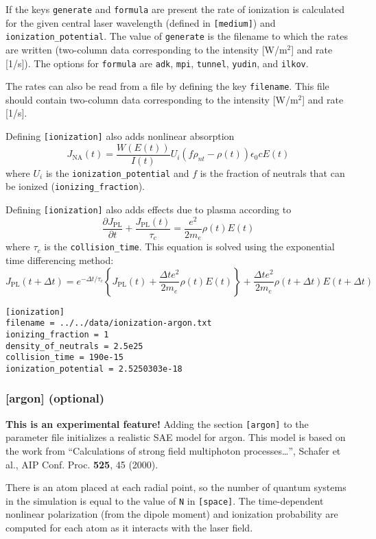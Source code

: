 \documentclass{article}
\begin{document}
If the keys \texttt{generate} and \texttt{formula} are present the
rate of ionization is calculated for the given central laser
wavelength (defined in \texttt{[medium]}) and
\texttt{ionization\_potential}. The value of \texttt{generate} is the
filename to which the rates are written (two-column data corresponding
to the intensity [W/m$^2$] and rate [1/s]). The options for
\texttt{formula} are \texttt{adk}, \texttt{mpi}, \texttt{tunnel},
\texttt{yudin}, and \texttt{ilkov}.

The rates can also be read from a file by defining the key
\texttt{filename}. This file should contain two-column data
corresponding to the intensity [W/m$^2$] and rate [1/s].

Defining \texttt{[ionization]} also adds nonlinear absorption
\[J_{\mathrm{NA}}(t) = \frac{W(E(t))}{I(t)} U_i \left(f\rho_{nt} -
    \rho(t)\right) \epsilon_0 c E(t)\] where $U_i$ is the
\texttt{ionization\_potential} and $f$ is the fraction of neutrals
that can be ionized (\texttt{ionizing\_fraction}).

Defining \texttt{[ionization]} also adds effects due to plasma according to
\[\frac{\partial J_{\mathrm{PL}}}{\partial t} + \frac{J_{\mathrm{PL}}(t)}{\tau_c} = \frac{e^2}{2 m_e} \rho(t) E(t)\]
where $\tau_c$ is the \texttt{collision\_time}. This equation is
solved using the exponential time differencing method:
\[J_{\mathrm{PL}}(t+\Delta t) = e^{-\Delta t/\tau_c}\left\{J_{\mathrm{PL}}(t) + \frac{\Delta t e^2}{2 m_e}\rho(t)E(t)\right\} + \frac{\Delta t e^2}{2 m_e} \rho(t+\Delta t) E(t+\Delta t)\]

\begin{lstlisting}
[ionization]
filename = ../../data/ionization-argon.txt
ionizing_fraction = 1
density_of_neutrals = 2.5e25
collision_time = 190e-15
ionization_potential = 2.5250303e-18
\end{lstlisting}

\subsubsection{[argon] (optional)}
\textbf{This is an experimental feature!} Adding the section
\texttt{[argon]} to the parameter file initializes a realistic SAE
model for argon. This model is based on the work from ``Calculations
of strong field multiphoton processes\ldots'', Schafer et al., AIP
Conf. Proc. \textbf{525}, 45 (2000).

There is an atom placed at each radial point, so the number of quantum
systems in the simulation is equal to the value of \texttt{N} in
\texttt{[space]}. The time-dependent nonlinear polarization (from the
dipole moment) and ionization probability are computed for each atom
as it interacts with the laser field.
\end{document}
